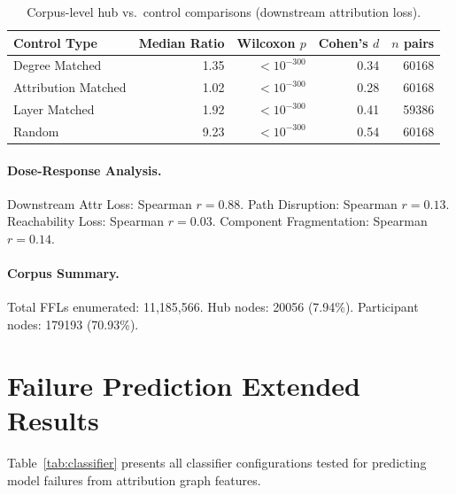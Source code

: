 \documentclass[11pt,a4paper]{article}
\begin{document}
\begin{table}[htbp]
\centering
\caption{Corpus-level hub vs.\ control comparisons (downstream attribution loss).}
\label{tab:ablation-corpus}
\begin{tabular}{lrrrr}
\toprule
Control Type & Median Ratio & Wilcoxon $p$ & Cohen's $d$ & $n$ pairs \\
\midrule
Degree Matched & 1.35 & $<10^{-300}$ & 0.34 & 60168 \\
Attribution Matched & 1.02 & $<10^{-300}$ & 0.28 & 60168 \\
Layer Matched & 1.92 & $<10^{-300}$ & 0.41 & 59386 \\
Random & 9.23 & $<10^{-300}$ & 0.54 & 60168 \\
\bottomrule
\end{tabular}
\end{table}

\paragraph{Dose-Response Analysis.}
Downstream Attr Loss: Spearman $r = 0.88$. 
Path Disruption: Spearman $r = 0.13$. 
Reachability Loss: Spearman $r = 0.03$. 
Component Fragmentation: Spearman $r = 0.14$. 

\paragraph{Corpus Summary.}
Total FFLs enumerated: 11,185,566. Hub nodes: 20056 (7.94\%). Participant nodes: 179193 (70.93\%).


\section{Failure Prediction Extended Results}
Table~\ref{tab:classifier} presents all classifier configurations tested for predicting model failures from attribution graph features.
\end{document}
